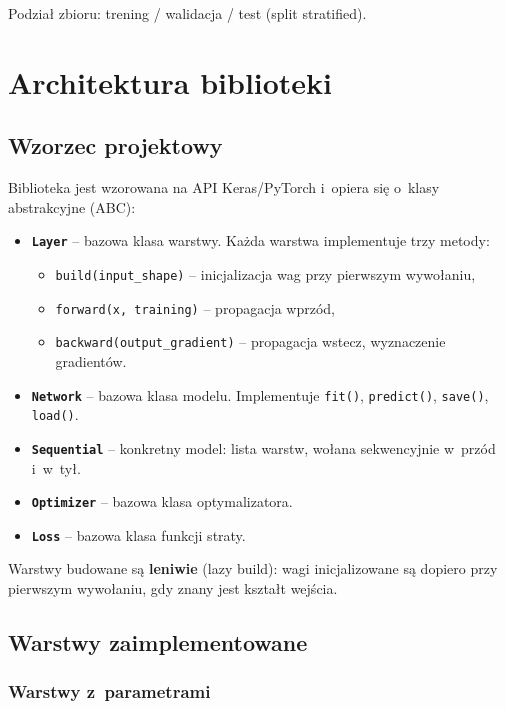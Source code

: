 \documentclass[12pt,a4paper]{article}
\begin{document}
Podział zbioru: trening / walidacja / test (split stratified).

\section{Architektura biblioteki}

\subsection{Wzorzec projektowy}

Biblioteka jest wzorowana na API Keras/PyTorch i~opiera się o~klasy abstrakcyjne (ABC):

\begin{itemize}
  \item \textbf{\texttt{Layer}} -- bazowa klasa warstwy. Każda warstwa implementuje trzy metody:
    \begin{itemize}
      \item \texttt{build(input\_shape)} -- inicjalizacja wag przy pierwszym wywołaniu,
      \item \texttt{forward(x, training)} -- propagacja wprzód,
      \item \texttt{backward(output\_gradient)} -- propagacja wstecz, wyznaczenie gradientów.
    \end{itemize}
  \item \textbf{\texttt{Network}} -- bazowa klasa modelu. Implementuje \texttt{fit()}, \texttt{predict()}, \texttt{save()}, \texttt{load()}.
  \item \textbf{\texttt{Sequential}} -- konkretny model: lista warstw, wołana sekwencyjnie w~przód i~w~tył.
  \item \textbf{\texttt{Optimizer}} -- bazowa klasa optymalizatora.
  \item \textbf{\texttt{Loss}} -- bazowa klasa funkcji straty.
\end{itemize}

Warstwy budowane są \textbf{leniwie} (lazy build): wagi inicjalizowane są dopiero przy pierwszym wywołaniu, gdy znany jest kształt wejścia.

\subsection{Warstwy zaimplementowane}

\subsubsection*{Warstwy z~parametrami}
\end{document}
